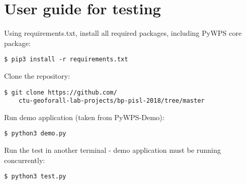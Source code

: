\chapter{User guide for testing} \label{testing}
\label{user-guide}


Using requirements.txt, install all required packages, including PyWPS core package: 
\begin{lstlisting}
$ pip3 install -r requirements.txt
\end{lstlisting}

Clone the repository:

\begin{lstlisting}
$ git clone https://github.com/
	ctu-geoforall-lab-projects/bp-pisl-2018/tree/master
\end{lstlisting}

Run demo application (taken from PyWPS-Demo):

\begin{lstlisting}
$ python3 demo.py
\end{lstlisting}

Run the test in another terminal - demo application must be running concurrently:

\begin{lstlisting}
$ python3 test.py
\end{lstlisting}






%
%
%
%
%




